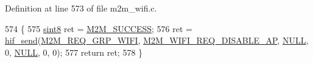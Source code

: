 Definition at line 573 of file m2m\+\_\+wifi.\+c.


\begin{DoxyCode}
574 \{
575     \hyperlink{group__DataT_gae35f10ffd0ac8dd2bc3e794da9bdfbc7}{sint8} ret = \hyperlink{nm__common_8h_a9ef27ba27aafdd1aa3a79d3ba2c36b8f}{M2M\_SUCCESS};
576     ret = \hyperlink{m2m__hif_8c_a13ba8ad11b2ac39516ca787386d16ce0}{hif\_send}(\hyperlink{nm__common_8h_a9ab02eb1aea02a75c3f5aade4eef1276aeb9a7d57324ba4b8a6c2a5f46dd499c2}{M2M\_REQ\_GRP\_WIFI}, 
      \hyperlink{group__WlanEnums_ggaa62989ea5e2977b374a04db81c89d524a472b080df0dcfd0cc31d9299c252ef38}{M2M\_WIFI\_REQ\_DISABLE\_AP}, \hyperlink{group__BSPDefine_ga070d2ce7b6bb7e5c05602aa8c308d0c4}{NULL}, 0, \hyperlink{group__BSPDefine_ga070d2ce7b6bb7e5c05602aa8c308d0c4}{NULL}, 0, 0);
577     \textcolor{keywordflow}{return} ret;
578 \}
\end{DoxyCode}
